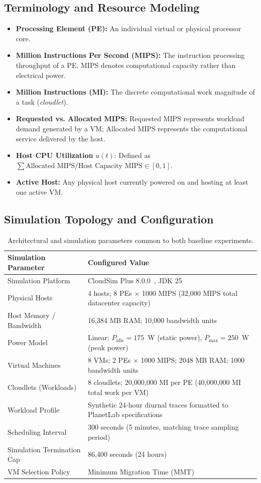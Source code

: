 \documentclass[11pt,a4paper]{article}
\begin{document}
\subsection{Terminology and Resource Modeling}
\begin{itemize}[leftmargin=1.8em, itemsep=2pt]
  \item \textbf{Processing Element (PE):} An individual virtual or physical processor core.
  \item \textbf{Million Instructions Per Second (MIPS):} The instruction processing throughput of a PE. MIPS denotes computational capacity rather than electrical power.
  \item \textbf{Million Instructions (MI):} The discrete computational work magnitude of a task (\emph{cloudlet}).
  \item \textbf{Requested vs. Allocated MIPS:} Requested MIPS represents workload demand generated by a VM; Allocated MIPS represents the computational service delivered by the host.
  \item \textbf{Host CPU Utilization} $u(t)$: Defined as $\sum \text{Allocated MIPS} / \text{Host Capacity MIPS} \in [0, 1]$.
  \item \textbf{Active Host:} Any physical host currently powered on and hosting at least one active VM.
\end{itemize}

\subsection{Simulation Topology and Configuration}
\begin{table}[H]
\centering
\small
\begin{tabular}{@{}ll@{}}
\toprule
\textbf{Simulation Parameter} & \textbf{Configured Value} \\ \midrule
Simulation Platform & CloudSim Plus 8.0.0~\cite{cloudsimplus}, JDK 25 \\
Physical Hosts & 4 hosts; 8 PEs $\times$ 1000 MIPS (32{,}000 MIPS total datacenter capacity) \\
Host Memory / Bandwidth & 16{,}384 MB RAM; 10{,}000 bandwidth units \\
Power Model & Linear: $P_{\text{idle}} = 175$~W (static power), $P_{\max} = 250$~W (peak power) \\
Virtual Machines & 8 VMs; 2 PEs $\times$ 1000 MIPS; 2048 MB RAM; 1000 bandwidth units \\
Cloudlets (Workloads) & 8 cloudlets; 20{,}000{,}000 MI per PE (40{,}000{,}000 MI total work per VM) \\
Workload Profile & Synthetic 24-hour diurnal traces formatted to PlanetLab specifications \\
Scheduling Interval & 300 seconds (5 minutes, matching trace sampling period) \\
Simulation Termination Cap & 86{,}400 seconds (24 hours) \\
VM Selection Policy & Minimum Migration Time (MMT) \\
\bottomrule
\end{tabular}
\caption{Architectural and simulation parameters common to both baseline experiments.}
\label{tab:config}
\end{table}
\end{document}
